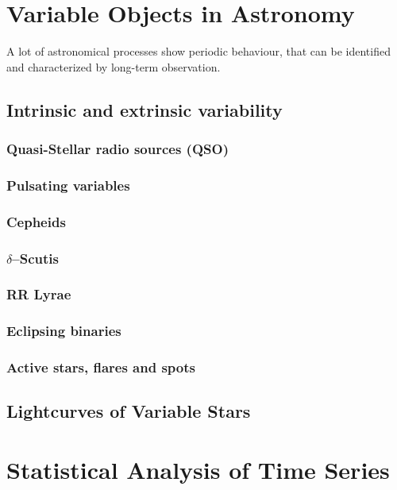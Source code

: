 \section{Variable Objects in Astronomy}
\label{sec:theory-variable-objects}

A lot of astronomical processes show periodic behaviour, that can be identified and characterized by long-term observation.

\subsection{Intrinsic and extrinsic variability}
\subsubsection{Quasi-Stellar radio sources (QSO)}
\subsubsection{Pulsating variables}
\subsubsection{Cepheids}
\subsubsection{$\delta$--Scutis}
\subsubsection{RR Lyrae}
\subsubsection{Eclipsing binaries}
\subsubsection{Active stars, flares and spots}

\subsection{Lightcurves of Variable Stars}

\section{Statistical Analysis of Time Series}

